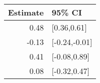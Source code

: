 \begin{tabular}{rl}
  \hline
Estimate & 95\% CI \\ 
  \hline
0.48 & [0.36,0.61] \\ 
  -0.13 & [-0.24,-0.01] \\ 
  0.41 & [-0.08,0.89] \\ 
  0.08 & [-0.32,0.47] \\ 
   \hline
\end{tabular}

